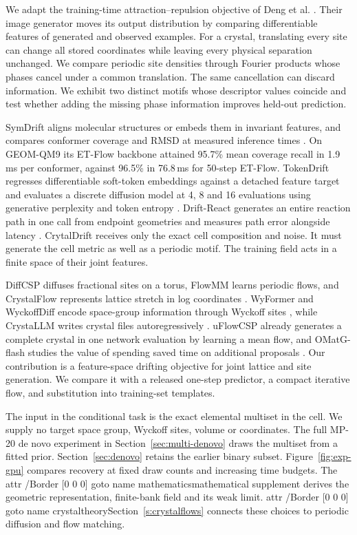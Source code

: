 \documentclass[10pt]{article}
\newcommand{\crytaljump}[2]{\leavevmode\pdfstartlink attr {/Border [0 0 0]} goto name {#1}#2\pdfendlink}
\newcommand{\crytaljump}[2]{\hyperlink{#1}{#2}}
\begin{document}
We adapt the training-time attraction--repulsion objective of Deng et al. \cite{deng}. Their image generator moves its output distribution by comparing differentiable features of generated and observed examples. For a crystal, translating every site can change all stored coordinates while leaving every physical separation unchanged. We compare periodic site densities through Fourier products whose phases cancel under a common translation. The same cancellation can discard information. We exhibit two distinct motifs whose descriptor values coincide and test whether adding the missing phase information improves held-out prediction.

SymDrift aligns molecular structures or embeds them in invariant features, and compares conformer coverage and RMSD at measured inference times \cite{symdrift}. On GEOM-QM9 its ET-Flow backbone attained 95.7\% mean coverage recall in 1.9\,ms per conformer, against 96.5\% in 76.8\,ms for 50-step ET-Flow. TokenDrift regresses differentiable soft-token embeddings against a detached feature target and evaluates a discrete diffusion model at 4, 8 and 16 evaluations using generative perplexity and token entropy \cite{tokendrift}. Drift-React generates an entire reaction path in one call from endpoint geometries and measures path error alongside latency \cite{driftreact}. CrytalDrift receives only the exact cell composition and noise. It must generate the cell metric as well as a periodic motif. The training field acts in a finite space of their joint features.

DiffCSP diffuses fractional sites on a torus, FlowMM learns periodic flows, and CrystalFlow represents lattice stretch in log coordinates \cite{diffcsp,flowmm,crystalflow}. WyFormer and WyckoffDiff encode space-group information through Wyckoff sites \cite{wyformer,wyckoff}, while CrystaLLM writes crystal files autoregressively \cite{crystallm}. uFlowCSP already generates a complete crystal in one network evaluation by learning a mean flow, and OMatG-flash studies the value of spending saved time on additional proposals \cite{uflow,omatg}. Our contribution is a feature-space drifting objective for joint lattice and site generation. We compare it with a released one-step predictor, a compact iterative flow, and substitution into training-set templates.

The input in the conditional task is the exact elemental multiset in the cell. We supply no target space group, Wyckoff sites, volume or coordinates. The full MP-20 de novo experiment in Section~\ref{sec:multi-denovo} draws the multiset from a fitted prior. Section~\ref{sec:denovo} retains the earlier binary subset. Figure~\ref{fig:exp-gpu} compares recovery at fixed draw counts and increasing time budgets. The \crytaljump{mathematics}{mathematical supplement} derives the geometric representation, finite-bank field and its weak limit. \crytaljump{crystaltheory}{Section~\ref{s:crystalflows}} connects these choices to periodic diffusion and flow matching.


\end{document}
